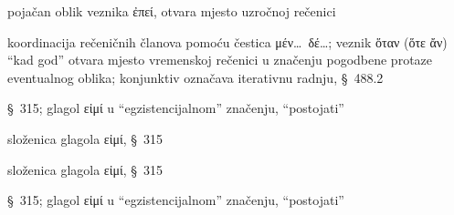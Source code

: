 \begin{description}[noitemsep]
\item[ἐπειδήπερ] pojačan oblik veznika ἐπεί, otvara mjesto uzročnoj rečenici
\item[ὅταν μὲν\dots\ ὅταν δὲ\dots] koordinacija rečeničnih članova pomoću čestica μέν\dots\ δέ\dots; veznik ὅταν (ὅτε ἄν) ``kad god'' otvara mjesto vremenskoj rečenici u značenju pogodbene protaze eventualnog oblika; konjunktiv označava iterativnu radnju, §~488.2
\item[ὦμεν] §~315; glagol εἰμί u ``egzistencijalnom'' značenju, ``postojati''
\item[πάρεστιν] složenica glagola εἰμί, §~315
\item[παρῇ] složenica glagola εἰμί, §~315
\item[ἐσμέν] §~315; glagol εἰμί u ``egzistencijalnom'' značenju, ``postojati''

\end{description}



